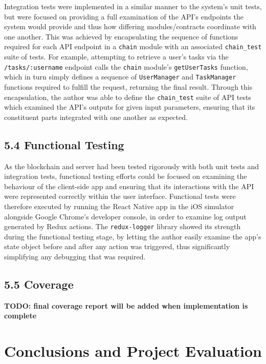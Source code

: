 \documentclass[12pt]{report}
\begin{document}
Integration tests were implemented in a similar manner to the system's
unit tests, but were focused on providing a full examination of the
API's endpoints the system would provide and thus how differing
modules/contracts coordinate with one another. This was achieved by
encapsulating the sequence of functions required for each API endpoint
in a \texttt{chain} module with an associated \texttt{chain\_test} suite
of tests. For example, attempting to retrieve a user's tasks via the
\texttt{/tasks/:username} endpoint calls the \texttt{chain} module's
\texttt{getUserTasks} function, which in turn simply defines a sequence
of \texttt{UserManager} and \texttt{TaskManager} functions required to
fulfill the request, returning the final result. Through this
encapsulation, the author was able to define the \texttt{chain\_test}
suite of API tests which examined the API's outputs for given input
parameters, ensuring that its constituent parts integrated with one
another as expected.

\section{5.4 Functional Testing}\label{functional-testing}

As the blockchain and server had been tested rigorously with both unit
tests and integration tests, functional testing efforts could be focused
on examining the behaviour of the client-side app and ensuring that its
interactions with the API were represented correctly within the user
interface. Functional tests were therefore executed by running the React
Native app in the iOS simulator alongside Google Chrome's developer
console, in order to examine log output generated by Redux actions. The
\texttt{redux-logger} library showed its strength during the functional
testing stage, by letting the author easily examine the app's state
object before and after any action was triggered, thus significantly
simplifying any debugging that was required.

\section{5.5 Coverage}\label{coverage}

\textbf{TODO: final coverage report will be added when implementation is
complete}

\chapter{Conclusions and Project
Evaluation}
\end{document}
